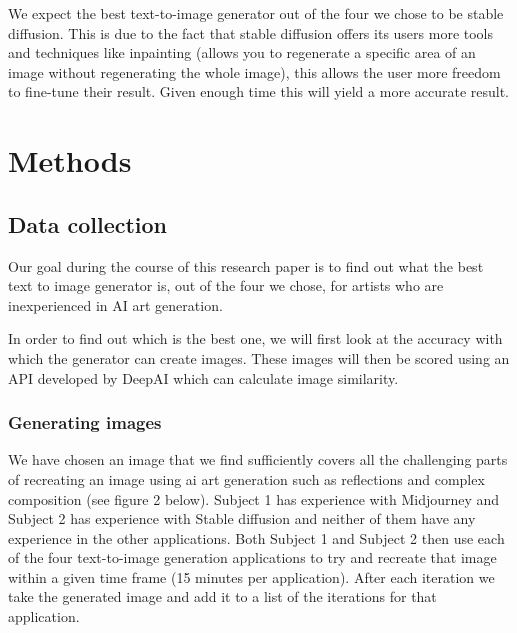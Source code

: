 \documentclass[]{report}
\begin{document}
	\pagebreak
	
	We expect the best text-to-image generator out of the four we chose to be stable diffusion. This is due to the fact that stable diffusion offers its users more tools and techniques like inpainting (allows you to regenerate a specific area of an image without regenerating the whole image), this allows the user more freedom to fine-tune their result. Given enough time this will yield a more accurate result.
	
	\pagebreak
	
	\section{Methods}
	
	\subsection{Data collection}
	Our goal during the course of this research paper is to find out what the best text to image generator is, out of the four we chose, for artists who are inexperienced in AI art generation.
	
	In order to find out which is the best one, we will first look at the accuracy with which the generator can create images. These images will then be scored using an API developed by DeepAI which can calculate image similarity. \cite{imageSimilarity}
	
	
	\subsubsection{Generating images}
	
	We have chosen an image that we find sufficiently covers all the challenging parts of recreating an image using ai art generation such as reflections and complex composition (see figure 2 below).
	Subject 1 has experience with Midjourney and Subject 2 has experience with Stable diffusion and neither of them have any experience in the other applications. Both Subject 1 and Subject 2 then use each of the four text-to-image generation applications to try and recreate that image within a given time frame (15 minutes per application). After each iteration we take the generated image and add it to a list of the iterations for that application. 
	
\end{document}
